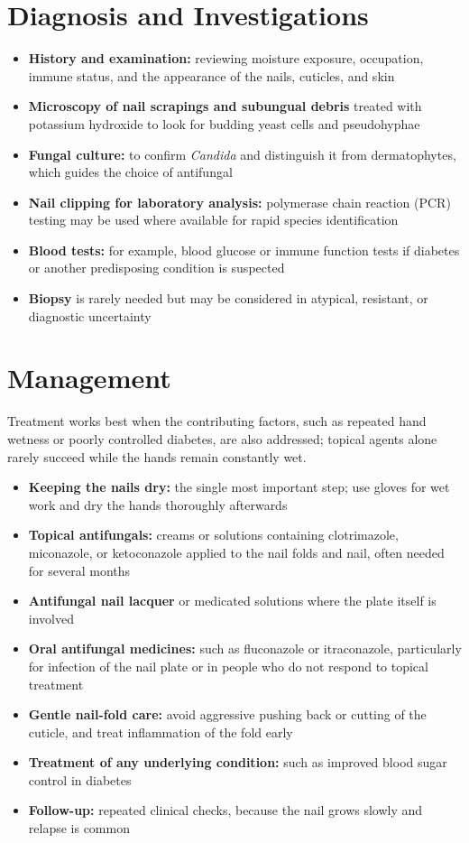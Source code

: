 \section*{Diagnosis and Investigations}
\begin{itemize}
    \item \textbf{History and examination:} reviewing moisture exposure, occupation, immune status, and the appearance of the nails, cuticles, and skin
    \item \textbf{Microscopy of nail scrapings and subungual debris} treated with potassium hydroxide to look for budding yeast cells and pseudohyphae
    \item \textbf{Fungal culture:} to confirm \textit{Candida} and distinguish it from dermatophytes, which guides the choice of antifungal
    \item \textbf{Nail clipping for laboratory analysis:} polymerase chain reaction (PCR) testing may be used where available for rapid species identification
    \item \textbf{Blood tests:} for example, blood glucose or immune function tests if diabetes or another predisposing condition is suspected
    \item \textbf{Biopsy} is rarely needed but may be considered in atypical, resistant, or diagnostic uncertainty
\end{itemize}

\section*{Management}
Treatment works best when the contributing factors, such as repeated hand wetness or poorly controlled diabetes, are also addressed; topical agents alone rarely succeed while the hands remain constantly wet.
\begin{itemize}
    \item \textbf{Keeping the nails dry:} the single most important step; use gloves for wet work and dry the hands thoroughly afterwards
    \item \textbf{Topical antifungals:} creams or solutions containing clotrimazole, miconazole, or ketoconazole applied to the nail folds and nail, often needed for several months
    \item \textbf{Antifungal nail lacquer} or medicated solutions where the plate itself is involved
    \item \textbf{Oral antifungal medicines:} such as fluconazole or itraconazole, particularly for infection of the nail plate or in people who do not respond to topical treatment
    \item \textbf{Gentle nail-fold care:} avoid aggressive pushing back or cutting of the cuticle, and treat inflammation of the fold early
    \item \textbf{Treatment of any underlying condition:} such as improved blood sugar control in diabetes
    \item \textbf{Follow-up:} repeated clinical checks, because the nail grows slowly and relapse is common
\end{itemize}

